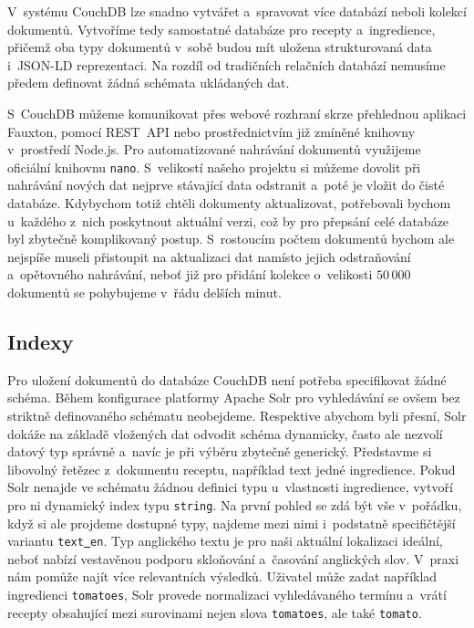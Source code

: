 V~systému CouchDB lze snadno vytvářet a~spravovat více databází neboli kolekcí dokumentů. Vytvoříme tedy samostatné databáze pro recepty a~ingredience, přičemž oba typy dokumentů v~sobě budou mít uložena strukturovaná data i~JSON-LD reprezentaci. Na rozdíl od tradičních relačních databází nemusíme předem definovat žádná schémata ukládaných dat.

S~CouchDB můžeme komunikovat přes webové rozhraní skrze přehlednou aplikaci Fauxton, pomocí REST~API nebo prostřednictvím již zmíněné knihovny v~prostředí Node.js. Pro automatizované nahrávání dokumentů využijeme oficiální knihovnu \texttt{nano}. S~velikostí našeho projektu si můžeme dovolit při nahrávání nových dat nejprve stávající data odstranit a~poté je vložit do čisté databáze. Kdybychom totiž chtěli dokumenty aktualizovat, potřebovali bychom u~každého z~nich poskytnout aktuální verzi, což by pro přepsání celé databáze byl zbytečně komplikovaný postup. S~rostoucím počtem dokumentů bychom ale nejspíše museli přistoupit na aktualizaci dat namísto jejich odstraňování a~opětovného nahrávání, neboť již pro přidání kolekce o~velikosti $50\,000$ dokumentů se pohybujeme v~řádu delších minut.

\subsection{Indexy}

Pro uložení dokumentů do databáze CouchDB není potřeba specifikovat žádné schéma. Během konfigurace platformy Apache Solr pro vyhledávání se ovšem bez striktně definovaného schématu neobejdeme. Respektive abychom byli přesní, Solr dokáže na základě vložených dat odvodit schéma dynamicky, často ale nezvolí datový typ správně a~navíc je při výběru zbytečně generický. Představme si libovolný řetězec z~dokumentu receptu, například text jedné ingredience. Pokud Solr nenajde ve schématu žádnou definici typu u~vlastnosti ingredience, vytvoří pro ni dynamický index typu \texttt{string}. Na první pohled se zdá být vše v~pořádku, když si ale projdeme dostupné typy, najdeme mezi nimi i~podstatně specifičtější variantu \texttt{text\underline{{ }}en}. Typ anglického textu je pro naši aktuální lokalizaci ideální, neboť nabízí vestavěnou podporu skloňování a~časování anglických slov. V~praxi nám pomůže najít více relevantních výsledků. Uživatel může zadat například ingredienci \texttt{tomatoes}, Solr provede normalizaci vyhledávaného termínu a~vrátí recepty obsahující mezi surovinami nejen slova \texttt{tomatoes}, ale také \texttt{tomato}.

